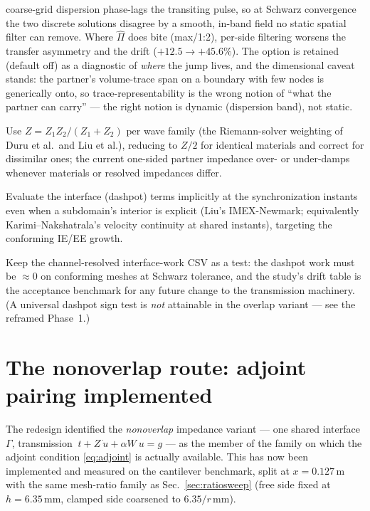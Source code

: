 \documentclass[11pt]{article}
\begin{document}
\begin{description}[style=unboxed,leftmargin=0pt,itemsep=2pt]
  coarse-grid dispersion phase-lags the transiting pulse, so at Schwarz
  convergence the two discrete solutions disagree by a smooth, in-band field
  no static spatial filter can remove. Where $\widehat\Pi$ does bite
  (max/1:2), per-side filtering worsens the transfer asymmetry and the drift
  ($+12.5 \to +45.6\%$). The option is retained (default off) as a diagnostic
  of \emph{where} the jump lives, and the dimensional caveat stands: the
  partner's volume-trace span on a boundary with few nodes is generically
  onto, so trace-representability is the wrong notion of ``what the partner
  can carry'' --- the right notion is dynamic (dispersion band), not static.
  \item[Phase 3 --- harmonic-mean impedance.] Use
  $Z = Z_1 Z_2/(Z_1 + Z_2)$ per wave family (the Riemann-solver weighting of
  Duru et al.\ and Liu et al.), reducing to $Z/2$ for identical materials and
  correct for dissimilar ones; the current one-sided partner impedance over-
  or under-damps whenever materials or resolved impedances differ.
  \item[Phase 4 --- implicit interface for explicit subdomains.] Evaluate the
  interface (dashpot) terms implicitly at the synchronization instants even
  when a subdomain's interior is explicit (Liu's IMEX-Newmark; equivalently
  Karimi--Nakshatrala's velocity continuity at shared instants), targeting the
  conforming IE/EE growth.
  \item[Regression metric.] Keep the channel-resolved interface-work CSV as a
  test: the dashpot work must be $\approx 0$ on conforming meshes at Schwarz
  tolerance, and the study's drift table is the acceptance benchmark for any
  future change to the transmission machinery. (A universal dashpot sign test
  is \emph{not} attainable in the overlap variant --- see the reframed
  Phase~1.)
\end{description}

\section{The nonoverlap route: adjoint pairing implemented}
\label{sec:nonoverlap}

The redesign identified the \emph{nonoverlap} impedance variant --- one shared
interface $\Gamma$, transmission $~t + Z\dot{~u} + \alpha W ~u = g$ --- as the
member of the family on which the adjoint condition \eqref{eq:adjoint} is
actually available. This has now been implemented and measured on the
cantilever benchmark, split at $x = 0.127$\,m with the same mesh-ratio family
as Sec.~\ref{sec:ratiosweep} (free side fixed at $h = 6.35$\,mm, clamped side
coarsened to $6.35/r$\,mm).
\end{document}
